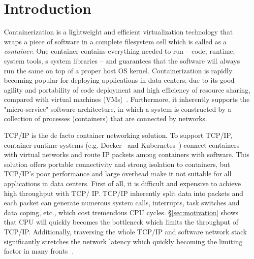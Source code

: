 \section{Introduction} \label{sec:introduction}


Containerization is a lightweight and efficient virtualization technology that wraps a piece of software in a complete filesystem cell which is called as a 
{\em container}. 
One container contains everything needed to run -- code, runtime, system tools, s
system libraries -- and guarantees that the software will always run the same on 
top of a proper host OS kernel. Containerization is rapidly
becoming popular for deploying applications in data centers, 
due to its good agility 
and portability of code deployment and high efficiency of resource sharing, 
compared with virtual machines (VMs)~\cite{?}. 
Furthermore, it inherently supports
the "micro-service" software architecture, in which a system is constructed by 
a collection of processes (containers) that are connected by networks.


TCP/IP is the de facto container networking solution. To support TCP/IP, 
container runtime systems (e.g. Docker~\cite{?} and
Kubernetes~\cite{?}) connect containers with virtual networks and route IP 
packets among containers with software. This solution offers portable 
connectivity and strong isolation to containers, but TCP/IP's poor performance
and large overhead make it not suitable for all applications in data centers.
First of all, it is difficult and expensive to achieve high throughput with TCP/
IP. TCP/IP inherently split data into packets and each packet can generate 
numerous system calls, interrupts, task switches and data coping, etc., which 
cost tremendous CPU cycles. \S\ref{sec:motivation} shows that CPU will quickly 
becomes the bottleneck which limits the throughput of TCP/IP. Additionally, 
traversing the whole TCP/IP and software network stack significantly stretches 
the network latency which quickly becoming the limiting factor in many fronts~\cite{?}.


